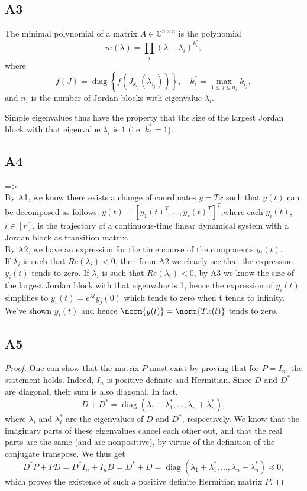 \documentclass[11pt]{article}
\newcommand{\complex}{\mathbb{C}} %
\begin{document}
\subsection*{A3}
The minimal polynomial of a matrix \(A \in \complex^{n \times n}\) is the polynomial
\[
m(\lambda) = \prod_i (\lambda - \lambda_i)^{k_i^*},
\]
where
\[
f(J) = \mathop{\mathrm{diag}} \left\{f\left(J_{k_{i_j}}(\lambda_{i_j})\right)\right\}, \quad k_i^* = \max_{1 \leqslant j \leqslant n_i} k_{i_j},
\]
and \(n_i\) is the number of Jordan blocks with eigenvalue \(\lambda_i\).

Simple eigenvalues thus have the property that the size of the largest Jordan block with that eigenvalue \(\lambda_i\) is \(1\) (i.e. \(k_i^* = 1\)).
\subsection*{A4}
=>\\
By A1, we know there exists a change of coordinates $y=Tx$ such that $y(t)$ can be decomposed as follows: $y(t) = [y_1(t)^T, . . . , y_r(t)^T]^T$,where each $y_i(t)$, $i \in [r]$, is the trajectory of a continuous-time linear dynamical system with a Jordan block as transition matrix.\\
By A2, we have an expression for the time course of the components $y_i(t)$.\\
If $\lambda_i$ is such that $Re(\lambda_i)<0$, then from A2 we clearly see that the expression $y_i(t)$ tends to zero. If $\lambda_i$ is such that $Re(\lambda_i)<0$, by A3 we know the size of the largest Jordan block with that eigenvalue is 1, hence the expression of $y_i(t)$ simplifies to $y_i(t)=e^{\lambda t} y_j(0)$ which tends to zero when t tends to infinity.\\
We've shown $y_i(t)$ and hence $\norm{y(t)}=\norm{Tx(t)}$ tends to zero.
\subsection*{A5}
\begin{proof}
	One can show that the matrix \(P\) must exist by proving that for \(P = I_n\), the statement holds.
	Indeed, \(I_n\) is positive definite and Hermitian.
	Since \(D\) and \(D^*\) are diagonal, their sum is also diagonal.
	In fact,
	\[
	D + D^* = \mathop{\mathrm{diag}}(\lambda_1 + \lambda_1^*, \dots, \lambda_n + \lambda_n^*),
	\]
	where \(\lambda_i\) and \(\lambda_i^*\) are the eigenvalues of \(D\) and \(D^*\), respectively.
	We know that the imaginary parts of these eigenvalues cancel each other out, and that the real parts are the same (and are nonpositive), by virtue of the definition of the conjugate transpose.
	We thus get
	\[
	D^*P + PD = D^*I_n + I_nD = D^* + D = \mathop{\mathrm{diag}}(\lambda_1 + \lambda_1^*, \dots, \lambda_n + \lambda_n^*) \preceq 0,
	\]
	which proves the existence of such a positive definite Hermitian matrix \(P\).
\end{proof}
\end{document}
